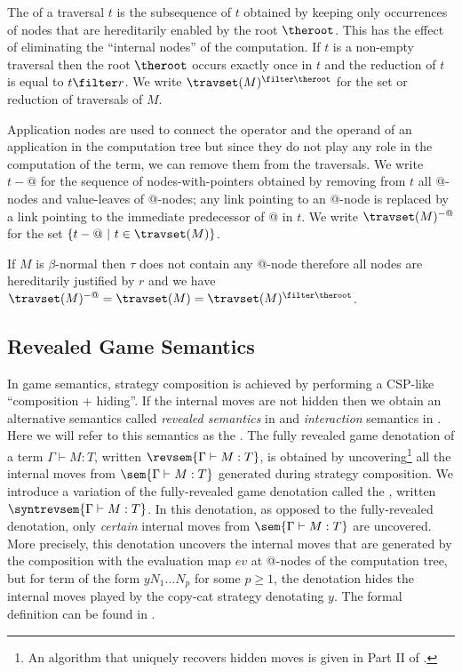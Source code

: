 The  of a traversal $t$ is the subsequence of $t$ obtained by keeping only occurrences of nodes that are hereditarily enabled by the root $\theroot$. This has the effect of eliminating the ``internal nodes'' of the computation. If $t$ is a non-empty traversal then the root $\theroot$ occurs exactly once in $t$ and the reduction of $t$ is equal to $t \filter r$. We write $\travset(M)^{\filter \theroot}$ for the set or reduction of traversals of $M$.

Application nodes are used to connect the operator and the operand of an application in the computation tree but since they do not play any role in the computation of the term, we can remove them from the traversals.  We write $t-@$ for the sequence of nodes-with-pointers obtained by removing from $t$ all @-nodes and value-leaves of @-nodes; any link pointing to an @-node is replaced by a link pointing to the immediate predecessor of @ in $t$. We write $\travset(M)^{-@}$ for the set $\{ t - @ \ | \  t \in \travset(M) \}$.
\begin{remark}
If $M$ is $\beta$-normal then $\tau$ does not contain any @-node therefore all nodes are hereditarily justified by $r$ and we have $\travset(M)^{-@} = \travset(M) = \travset(M)^{\filter \theroot }$.
\end{remark}

\subsection{Revealed Game Semantics}

In game semantics, strategy composition is achieved by performing a CSP-like ``composition + hiding''. If the internal moves are not hidden then we obtain an alternative semantics called \emph{revealed semantics} in \cite{willgreenlandthesis} and \emph{interaction} semantics in \cite{DBLP:conf/sas/DimovskiGL05}. Here we will refer to this semantics as the . The fully revealed game denotation of a term $\Gamma \vdash M :T$, written $\revsem{\Gamma \vdash M : T}$, is obtained by uncovering\footnote{An algorithm that uniquely recovers hidden moves is given in Part II of
  \cite{hylandong_pcf}.} all the internal moves from $\sem{\Gamma \vdash
  M : T}$ generated during strategy composition.
We introduce a variation of the fully-revealed game denotation called the , written $\syntrevsem{\Gamma \vdash
  M : T}$. In this denotation, as opposed to the fully-revealed denotation,
only \emph{certain} internal moves from $\sem{\Gamma \vdash
  M : T}$ are uncovered. More precisely, this denotation uncovers
  the internal moves that are generated by the composition with the evaluation map $ev$ at @-nodes of the computation tree, but for term of the form $y N_1 \ldots N_p$ for some $p\geq1$, the denotation hides the internal moves
  played by the copy-cat strategy denotating $y$. The formal definition can be found in \cite{localbeta2008}.

